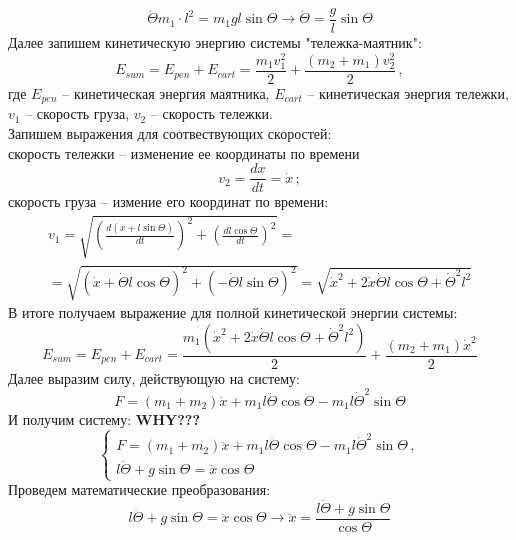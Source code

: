 \documentclass[a5paper, 10pt]{article}
\theoremstyle{definition}
\theoremstyle{plain}
\theoremstyle{remark}
\begin{document}
\begin{equation}
\ddot{\Theta}  m_1 \cdot l^2  = m_1 g l  \sin \Theta \to \ddot{\Theta} = \frac{g}{l} \sin \Theta
\end{equation}
Далее запишем кинетическую энергию системы "тележка-маятник":
\begin{equation}
E_{sum} = E_{pen} + E_{cart} = \frac{m_1 v_1^2}{2} +  \frac{(m_2 + m_1) v_2^2}{2} \, ,
\end{equation}
где $ E_{pen}$ -- кинетическая энергия маятника, $ E_{cart}$ -- кинетическая энергия тележки, $v_1$ -- скорость груза, $v_2$ -- скорость тележки.\\
Запишем выражения для соотвествующих скоростей:\\
 скорость тележки -- изменение ее координаты по времени
\begin{equation}
v_2 = \frac{dx}{dt} = \dot{x} \, ;
\end{equation}
скорость груза -- измение его координат по времени:
\begin{multline}
v_1 = \sqrt{\left( \frac{d \left( x + l \sin \Theta  \right)}{dt} \right)^2 + \left(  \frac{d l \cos \Theta }{dt}  \right)^2} = \\
= \sqrt{\left( \dot{x} + \dot{\Theta} l \cos \Theta \right)^2 + \left( -  \dot{\Theta} l \sin \Theta \right)^2} = 
 \sqrt{\dot{x}^2 +2 \dot{x} \dot{\Theta} l \cos \Theta +  \dot{\Theta}^2 l^2}
\end{multline}
В итоге получаем выражение для полной кинетической энергии системы:
\begin{equation}
E_{sum} = E_{pen} + E_{cart} = \frac{m_1 (\dot{x}^2 +2 \dot{x} \dot{\Theta} l \cos \Theta +  \dot{\Theta}^2 l^2)}{2} +  \frac{(m_2 + m_1) \dot{x}^2}{2} 
\end{equation}
Далее выразим силу, действующую на систему:
\begin{equation}
F = (m_1 + m_2) \ddot{x} + m_1 l \ddot{\Theta} \cos \Theta - m_1 l \dot{\Theta} ^2 \sin \Theta
\end{equation}
И получим систему: \textbf{WHY???}
\begin{equation}
\begin{cases}
F = (m_1 + m_2) \ddot{x} + m_1 l \ddot{\Theta} \cos \Theta - m_1 l \dot{\Theta} ^2 \sin \Theta \, , \\
l \ddot{\Theta} + g \sin \Theta = \ddot{x} \cos \Theta
\end{cases}
\end{equation} 
Проведем математические преобразования:
\begin{equation}
l \ddot{\Theta} + g \sin \Theta = \ddot{x} \cos \Theta \to  \ddot{x} = \frac{l \ddot{\Theta} + g \sin \Theta }{ \cos \Theta}
\end{equation}
\end{document}

